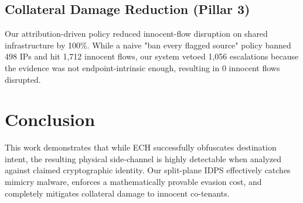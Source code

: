 \documentclass[10pt, conference]{IEEEtran}
\begin{document}
\subsection{Collateral Damage Reduction (Pillar 3)}
Our attribution-driven policy reduced innocent-flow disruption on shared infrastructure by 100\%. While a naive "ban every flagged source" policy banned 498 IPs and hit 1,712 innocent flows, our system vetoed 1,056 escalations because the evidence was not endpoint-intrinsic enough, resulting in 0 innocent flows disrupted.

\section{Conclusion}
This work demonstrates that while ECH successfully obfuscates destination intent, the resulting physical side-channel is highly detectable when analyzed against claimed cryptographic identity. Our split-plane IDPS effectively catches mimicry malware, enforces a mathematically provable evasion cost, and completely mitigates collateral damage to innocent co-tenants.



\end{document}
